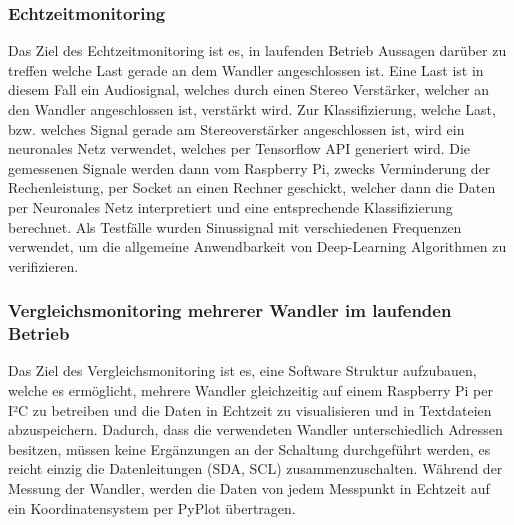 \subsubsection{Echtzeitmonitoring}
Das Ziel des Echtzeitmonitoring ist es, in laufenden Betrieb Aussagen darüber zu treffen welche Last gerade an dem Wandler angeschlossen ist. Eine Last ist in diesem Fall ein Audiosignal, welches durch einen Stereo Verstärker, welcher an den Wandler angeschlossen ist, verstärkt wird.  Zur Klassifizierung, welche Last, bzw. welches Signal gerade am Stereoverstärker angeschlossen ist, wird ein neuronales Netz verwendet, welches per Tensorflow API generiert wird. Die gemessenen Signale werden dann vom Raspberry Pi, zwecks Verminderung der Rechenleistung, per Socket an einen Rechner geschickt, welcher dann die Daten per Neuronales Netz interpretiert und eine entsprechende Klassifizierung berechnet. Als Testfälle wurden Sinussignal mit verschiedenen Frequenzen verwendet, um die allgemeine Anwendbarkeit von Deep-Learning Algorithmen zu verifizieren. 


\subsubsection{Vergleichsmonitoring mehrerer Wandler im laufenden Betrieb}

Das Ziel des Vergleichsmonitoring ist es, eine Software Struktur aufzubauen, welche es ermöglicht, mehrere Wandler gleichzeitig auf einem Raspberry Pi per I²C zu betreiben und die Daten in Echtzeit zu visualisieren und in Textdateien abzuspeichern. Dadurch, dass die verwendeten Wandler unterschiedlich Adressen besitzen, müssen keine Ergänzungen an der Schaltung durchgeführt werden, es reicht einzig die Datenleitungen (SDA, SCL) zusammenzuschalten. Während der Messung der Wandler, werden die Daten von jedem Messpunkt in Echtzeit auf ein Koordinatensystem per PyPlot übertragen. 


